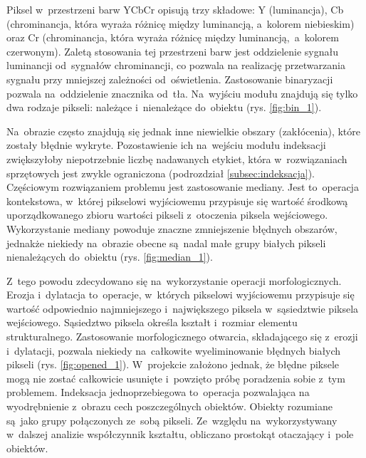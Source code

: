 Piksel w~przestrzeni barw YCbCr opisują trzy składowe: Y (luminancja), Cb (chrominancja, która wyraża różnicę między luminancją, a~kolorem niebieskim) oraz Cr (chrominancja, która wyraża różnicę między luminancją,~a~kolorem czerwonym). 
Zaletą stosowania tej przestrzeni barw jest oddzielenie sygnału luminancji od~sygnałów chrominancji, co pozwala na realizację przetwarzania sygnału przy mniejszej zależności od~oświetlenia.
Zastosowanie binaryzacji pozwala na~oddzielenie znacznika od~tła. 
Na~wyjściu modułu znajdują się tylko dwa rodzaje pikseli: należące i~nienależące do~obiektu (rys. \ref{fig:bin_1}).

Na~obrazie często znajdują się jednak inne niewielkie obszary (zakłócenia), które zostały błędnie wykryte. Pozostawienie ich na~wejściu modułu indeksacji zwiększyłoby niepotrzebnie liczbę nadawanych etykiet, która w~rozwiązaniach sprzętowych jest zwykle ograniczona (podrozdział \ref{subsec:indeksacja}).
Częściowym rozwiązaniem problemu jest zastosowanie mediany. 
Jest to~operacja kontekstowa, w~której pikselowi wyjściowemu przypisuje się wartość środkową uporządkowanego zbioru wartości pikseli z~otoczenia piksela wejściowego. 
Wykorzystanie mediany powoduje znaczne zmniejszenie błędnych obszarów, jednakże niekiedy na~obrazie obecne są~nadal małe grupy białych pikseli nienależących do~obiektu (rys. \ref{fig:median_1}).

Z~tego powodu zdecydowano się na~wykorzystanie operacji morfologicznych. 
Erozja i~dylatacja to~operacje, w~których pikselowi wyjściowemu przypisuje się wartość odpowiednio najmniejszego i~największego piksela w~sąsiedztwie piksela wejściowego. 
Sąsiedztwo piksela określa kształt i~rozmiar elementu strukturalnego.  
Zastosowanie morfologicznego otwarcia, składającego się z~erozji i~dylatacji, pozwala niekiedy na~całkowite wyeliminowanie błędnych białych pikseli (rys. \ref{fig:opened_1}).
W~projekcie założono jednak, że błędne piksele mogą nie zostać całkowicie usunięte i~powzięto próbę poradzenia sobie z~tym problemem.
Indeksacja jednoprzebiegowa to~operacja pozwalająca na wyodrębnienie z~obrazu cech poszczególnych obiektów. Obiekty rozumiane są~jako grupy połączonych ze~sobą pikseli. 
Ze~względu na~wykorzystywany w~dalszej analizie współczynnik kształtu, obliczano prostokąt otaczający i~pole obiektów. 

